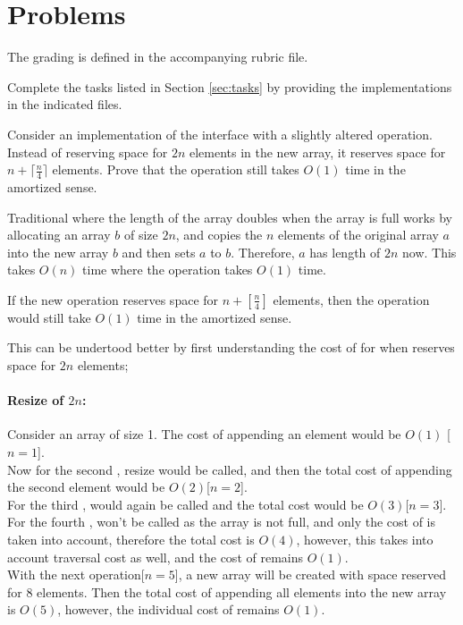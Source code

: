 \documentclass[addpoints]{exam}
\begin{document}

\part{Problems}

The grading is defined in the accompanying rubric file.
\begin{questions}
   Complete the tasks listed in Section \ref{sec:tasks} by providing the implementations in the indicated files.


  Consider an  implementation of the  interface with a slightly altered  operation. Instead of reserving space for $2n$ elements in the new array, it reserves space for $n + \lceil \frac{n}{4} \rceil$ elements. Prove that the  operation still takes $O(1)$ time in the amortized sense.
  \begin{solution}
  Traditional  where the length of the array doubles when the array is full works by allocating an array $b$ of size $ 2n $, and copies the $n$ elements of the original array $a$ into the new array $b$ and then sets $a$ to $b$. Therefore, $a$ has length of $2n$ now. This takes $O(n)$ time where the  operation takes $ O(1) $ time.

    If the new  operation reserves space for $ n + [\frac{n}{4}] $ elements, then the  operation would still take $O(1)$ time in the amortized sense.
    
    This can be undertood better by first understanding the cost of  for when  reserves space for $2n$ elements; 

    \subsection*{Resize of $2n$:}
    Consider an array of size 1. The cost of appending an element would be $ O(1) $ [$n = 1$]. \\ Now for the second , resize would be called, and then the total cost of appending the second element would be $O(2)$[$n = 2$]. \\ For the third ,  would again be called and the total cost would be $O(3)$[$n = 3$]. \\ 
    For the fourth ,  won't be called as the array is not full, and only the cost of  is taken into account, therefore the total cost is $O(4)$, however, this takes into account traversal cost as well, and the cost of  remains $ O(1) $. \\ With the next  operation[$n = 5$], a new array will be created with space reserved for 8 elements. Then the total cost of appending all elements into the new array is $ O(5) $, however, the individual cost of  remains $O(1)$. 
    

\end{solution}
\end{questions}
\end{document}
